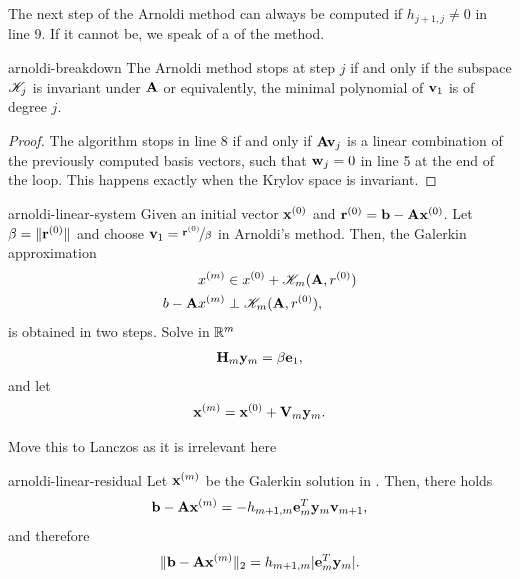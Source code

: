 \begin{remark}
  The next step of the Arnoldi method can always be computed if
  $h_{j+1,j}\neq 0$ in line 9. If it cannot be, we speak of a
   of the method.
\end{remark}

\begin{Lemma}{arnoldi-breakdown}
  The Arnoldi method stops at step $j$ if and only if the subspace $\mathscr K_j$ is invariant under $\mathbf A$ or equivalently, the minimal polynomial of $\mathbf v_1$ is of degree $j$.
\end{Lemma}

\begin{proof}
  The algorithm stops in line 8 if and only if $\mathbf A\mathbf v_j$ is a
  linear combination of the previously computed basis vectors, such
  that $\mathbf w_j=0$ in line 5 at the end of the loop. This happens
  exactly when the Krylov space is invariant.
\end{proof}

\begin{Theorem}{arnoldi-linear-system}
  Given an initial vector $\mathbf x^{(0)}$ and
  $\mathbf r^{(0)} = \mathbf b - \mathbf A \mathbf x^{(0)}$. Let $\beta=\lVert\mathbf r^{(0)}\rVert$
  and choose $\mathbf v_1 =\nicefrac{\mathbf r^{(0)}}{\beta}$ in Arnoldi's
  method. Then, the Galerkin approximation
  \begin{align}
    x^{(m)} &\in x^{(0)} + \mathscr K_m(\mathbf A,r^{(0)})\\
    b-\mathbf A x^{(m)} &\perp \mathscr K_m(\mathbf A,r^{(0)}),
  \end{align}
  is obtained in two steps. Solve in $\mathbb R^m$
  \begin{gather}
    \mathbf H_m\mathbf y_m = \beta\mathbf e_1,
  \end{gather}
  and let
  \begin{gather}
    \mathbf x^{(m)} = \mathbf x^{(0)} + \mathbf V_m \mathbf y_m.
  \end{gather}
\end{Theorem}

\begin{todo}
  Move this to Lanczos as it is irrelevant here
\end{todo}

\begin{Theorem}{arnoldi-linear-residual}
  Let $\mathbf x^{(m)}$ be the Galerkin solution in
  . Then, there holds
  \begin{gather}
    \mathbf b-\mathbf A\mathbf x^{(m)} = -h_{m+1,m} \mathbf e_m^T \mathbf y_m \mathbf v_{m+1},
  \end{gather}
  and therefore
  \begin{gather}
    \lVert\mathbf b-\mathbf A\mathbf x^{(m)}\rVert_2 = h_{m+1,m} \lvert\mathbf e_m^T \mathbf y_m\rvert.
  \end{gather}  
\end{Theorem}

